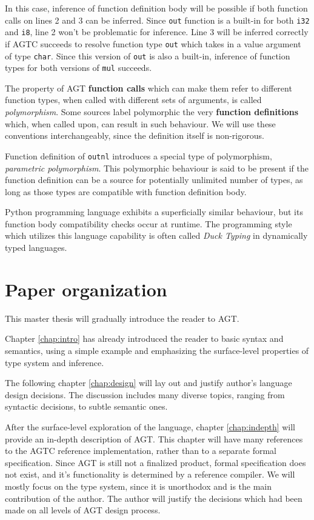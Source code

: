 \documentclass[times, utf8, diplomski]{fer}
\theoremstyle{definition}
\begin{document}
In this case, inference of function definition body will be possible if both function calls on lines
2 and 3 can be inferred. Since \texttt{out} function is a built-in for both \texttt{i32} and \texttt{i8},
line 2 won't be problematic for inference. Line 3 will be inferred correctly if AGTC succeeds to resolve
function type \texttt{out} which takes in a value argument of type \texttt{char}. 
Since this version of \texttt{out} is also a built-in,
inference of function types for both versions of \texttt{mul} succeeds.

The property of AGT \textbf{function calls} which can make them refer to different function types, 
when called with different sets of arguments, is called \textit{polymorphism}.
Some sources label polymorphic the very \textbf{function definitions} which, when called upon, 
can result in such behaviour.
We will use these conventions interchangeably, since the definition itself is non-rigorous.

Function definition of \texttt{outnl} introduces a special type of polymorphism, 
\textit{parametric polymorphism}. This polymorphic behaviour is said to be present if the
function definition can be a source for potentially unlimited number of types, 
as long as those types are compatible with function definition body.

Python programming language exhibits a superficially similar behaviour, but its
function body compatibility checks occur at runtime. 
The programming style which utilizes this language capability is often called \textit{Duck Typing}
\citep{c_py_duck_typing} in dynamically typed languages.


\section{Paper organization}

This master thesis will gradually introduce the reader to AGT. 

Chapter \ref{chap:intro} has already introduced the reader to basic syntax and semantics,
using a simple example and emphasizing the surface-level properties of type system and inference. 

The following chapter \ref{chap:design} will lay out and justify author's
language design decisions. The discussion includes many diverse topics,
ranging from syntactic decisions, to subtle semantic ones.

After the surface-level exploration of the language, chapter \ref{chap:indepth}
will provide an in-depth description of AGT.
This chapter will have many references to the AGTC reference implementation, 
rather than to a separate formal specification. Since AGT is still not a finalized product,
formal specification does not exist, and it's functionality is determined by a reference compiler.
We will mostly focus on the type system, since it is unorthodox and is the main
contribution of the author.  The author will justify the decisions which had been
made on all levels of AGT design process.
\end{document}
